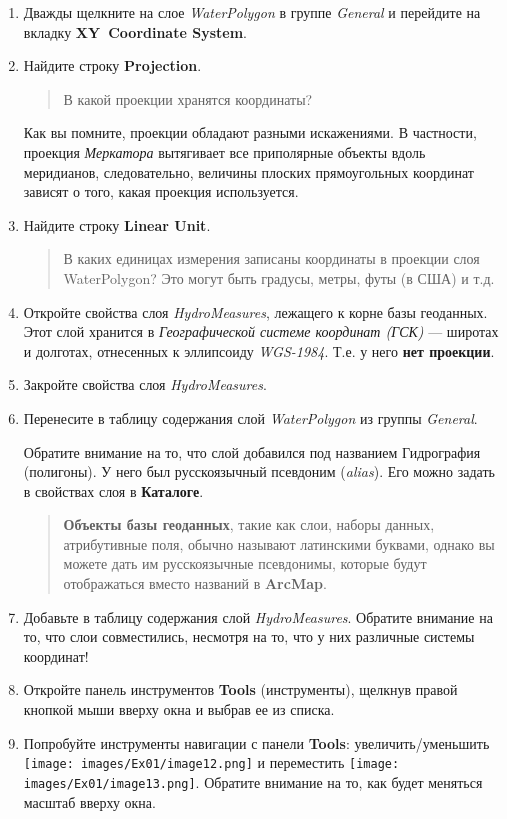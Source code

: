 \documentclass[12pt,]{book}
\begin{document}
\begin{enumerate}
\def\labelenumi{\arabic{enumi}.}
\item
  Дважды щелкните на слое \emph{WaterPolygon} в группе \emph{General} и перейдите на вкладку \textbf{XY~Coordinate System}.
\item
  Найдите строку \textbf{Projection}.

  \begin{quote}
  В какой проекции хранятся координаты?
  \end{quote}

  Как вы помните, проекции обладают разными искажениями. В частности, проекция \emph{Меркатора} вытягивает все приполярные объекты вдоль меридианов, следовательно, величины плоских прямоугольных координат зависят о того, какая проекция используется.
\item
  Найдите строку \textbf{Linear Unit}.

  \begin{quote}
  В каких единицах измерения записаны координаты в проекции слоя WaterPolygon? Это могут быть градусы, метры, футы (в США) и т.д.
  \end{quote}
\item
  Откройте свойства слоя \emph{HydroMeasures}, лежащего к корне базы геоданных. Этот слой хранится в \emph{Географической системе координат (ГСК)} --- широтах и долготах, отнесенных к эллипсоиду \emph{WGS-1984}. Т.е. у него \textbf{нет проекции}.
\item
  Закройте свойства слоя \emph{HydroMeasures}.
\item
  Перенесите в таблицу содержания слой \emph{WaterPolygon} из группы \emph{General}.

  Обратите внимание на то, что слой добавился под названием Гидрография (полигоны). У него был русскоязычный псевдоним (\emph{alias}). Его можно задать в свойствах слоя в \textbf{Каталоге}.

  \begin{quote}
  \textbf{Объекты базы геоданных}, такие как слои, наборы данных, атрибутивные поля, обычно называют латинскими буквами, однако вы можете дать им русскоязычные псевдонимы, которые будут отображаться вместо названий в \textbf{ArcMap}.
  \end{quote}
\item
  Добавьте в таблицу содержания слой \emph{HydroMeasures}. Обратите внимание на то, что слои совместились, несмотря на то, что у них различные системы координат!
\item
  Откройте панель инструментов \textbf{Tools} (инструменты), щелкнув правой кнопкой мыши вверху окна и выбрав ее из списка.
\item
  Попробуйте инструменты навигации с панели \textbf{Tools}: увеличить/уменьшить \texttt{[image: images/Ex01/image12.png]} и переместить \texttt{[image: images/Ex01/image13.png]}. Обратите внимание на то, как будет меняться масштаб вверху окна.


\end{enumerate}
\end{document}
